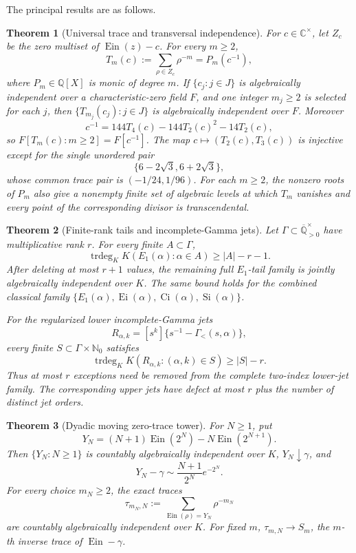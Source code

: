 \documentclass[11pt]{article}
\newtheorem{theorem}{Theorem}[section]
\theoremstyle{definition}
\theoremstyle{remark}
\newcommand{\Q}{\mathbb Q}
\newcommand{\Qbar}{\overline{\mathbb Q}}
\newcommand{\C}{\mathbb C}
\newcommand{\N}{\mathbb N}
\newcommand{\Ein}{\operatorname{Ein}}
\newcommand{\Ei}{\operatorname{Ei}}
\newcommand{\Ci}{\operatorname{Ci}}
\newcommand{\trdeg}{\operatorname{trdeg}}
\begin{document}
The principal results are as follows.

\begin{theorem}[Universal trace and transversal independence]
\label{thm:intro-universal}
For \(c\in\C^\times\), let \(Z_c\) be the zero multiset of
\(\Ein(z)-c\).  For every \(m\ge2\),
\[
 T_m(c):=\sum_{\rho\in Z_c}\rho^{-m}=P_m(c^{-1}),
\]
where \(P_m\in\Q[X]\) is monic of degree \(m\).  If
\(\{c_j:j\in J\}\) is algebraically independent over a characteristic-zero
field \(F\), and one integer \(m_j\ge2\) is selected for each \(j\), then
\(\{T_{m_j}(c_j):j\in J\}\) is algebraically independent over \(F\).
Moreover
\[
 c^{-1}=144T_4(c)-144T_2(c)^2-14T_2(c),
\]
so \(F[T_m(c):m\ge2]=F[c^{-1}]\).
The map \(c\mapsto(T_2(c),T_3(c))\) is injective except for the single
unordered pair
\[
 \{6-2\sqrt3,6+2\sqrt3\},
\]
whose common trace pair is \((-1/24,1/96)\).  For each \(m\ge2\), the
nonzero roots of \(P_m\) also give a nonempty finite set of algebraic levels
at which \(T_m\) vanishes and every point of the corresponding divisor is
transcendental.
\end{theorem}

\begin{theorem}[Finite-rank tails and incomplete-Gamma jets]
\label{thm:intro-tail-closures}
Let \(\Gamma\subset\Qbar_{>0}^{\times}\) have multiplicative rank \(r\).
For every finite \(A\subset\Gamma\),
\[
 \trdeg_KK(E_1(\alpha):\alpha\in A)\ge |A|-r-1.
\]
After deleting at most \(r+1\) values, the remaining full \(E_1\)-tail
family is jointly algebraically independent over \(K\).  The same bound
holds for the combined classical family
\(\{E_1(\alpha),\Ei(\alpha),\Ci(\alpha),\operatorname{Si}(\alpha)\}\).

For the regularized lower incomplete-Gamma jets
\[
 R_{\alpha,k}=[s^k]\{s^{-1}-\Gamma_{<}(s,\alpha)\},
\]
every finite \(S\subset\Gamma\times\N_0\) satisfies
\[
 \trdeg_KK(R_{\alpha,k}:(\alpha,k)\in S)\ge |S|-r.
\]
Thus at most \(r\) exceptions need be removed from the complete two-index
lower-jet family.  The corresponding upper jets have defect at most
\(r\) plus the number of distinct jet orders.
\end{theorem}

\begin{theorem}[Dyadic moving zero-trace tower]
\label{thm:intro-dyadic}
For \(N\ge1\), put
\[
 Y_N=(N+1)\Ein(2^N)-N\Ein(2^{N+1}).
\]
Then \(\{Y_N:N\ge1\}\) is countably algebraically independent over \(K\),
\(Y_N\downarrow\gamma\), and
\[
 Y_N-\gamma\sim \frac{N+1}{2^N}e^{-2^N}.
\]
For every choice \(m_N\ge2\), the exact traces
\[
 \tau_{m_N,N}:=\sum_{\Ein(\rho)=Y_N}\rho^{-m_N}
\]
are countably algebraically independent over \(K\).  For fixed \(m\),
\(\tau_{m,N}\to S_m\), the \(m\)-th inverse trace of \(\Ein-\gamma\).
\end{theorem}
\end{document}
